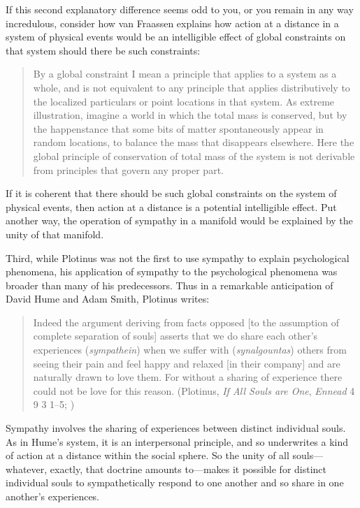 If this second explanatory difference seems odd to you, or you remain in any way incredulous, consider how van Fraassen explains how action at a distance in a system of physical events would be an intelligible effect of global constraints on that system should there be such constraints:
\begin{quote}
	By a global constraint I mean a principle that applies to a system as a whole, and is not equivalent to any principle that applies distributively to the localized particulars or point locations in that system. As extreme illustration, imagine a world in which the total mass is conserved, but by the happenstance that some bits of matter spontaneously appear in random locations, to balance the mass that disappears elsewhere. Here the global principle of conservation of total mass of the system is not derivable from principles that govern any proper part. \citep[3]{Fraassen:1989ao}
\end{quote}
If it is coherent that there should be such global constraints on the system of physical events, then action at a distance is a potential intelligible effect. Put another way, the operation of sympathy in a manifold would be explained by the unity of that manifold.

Third, while Plotinus was not the first to use sympathy to explain psychological phenomena, his application of sympathy to the psychological phenomena was broader than many of his predecessors. Thus in a remarkable anticipation of David Hume and Adam Smith, Plotinus writes:
\begin{quote}
	Indeed the argument deriving from facts opposed [to the assumption of complete separation of souls] asserts that we do share each other's experiences (\emph{sympathein}) when we suffer with (\emph{synalgountas}) others from seeing their pain and feel happy and relaxed [in their company] and are naturally drawn to love them. For without a sharing of experience there could not be love for this reason. (Plotinus, \emph{If All Souls are One}, \emph{Ennead} 4 9 3 1--5; \citealt[433--5]{Armstrong:1984aa})
\end{quote}
Sympathy involves the sharing of experiences between distinct individual souls. As in Hume's system, it is an interpersonal principle, and so underwrites a kind of action at a distance within the social sphere. So the unity of all souls---whatever, exactly, that doctrine amounts to---makes it possible for distinct individual souls to sympathetically respond to one another and so share in one another's experiences. 

